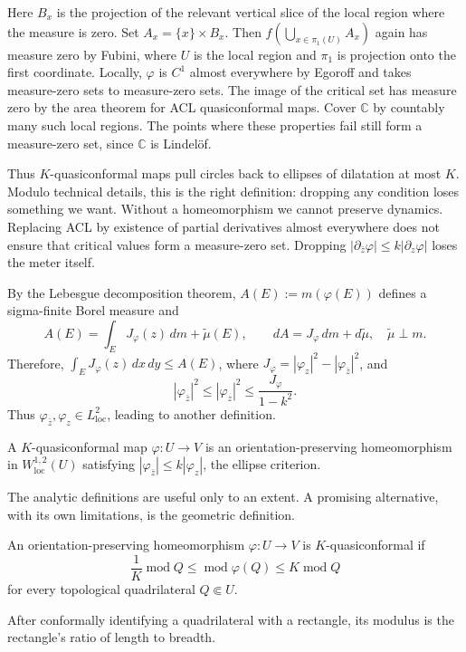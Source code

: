 \documentclass[11pt,a4paper]{article}
\begin{document}
Here \(B_x\) is the projection of the relevant vertical slice of the local region where the measure is zero. Set \(A_x=\{x\}\times B_x\).
Then \(f(\bigcup_{x\in\pi_1(U)}A_x)\) again has measure zero by Fubini, where \(U\) is the local region and \(\pi_1\) is projection onto the first coordinate.
Locally, \(\varphi\) is \(C^1\) almost everywhere by Egoroff and takes measure-zero sets to measure-zero sets. The image of the critical set has measure zero by the area theorem for ACL quasiconformal maps.
Cover \(\mathbb C\) by countably many such local regions. The points where these properties fail still form a measure-zero set, since \(\mathbb C\) is Lindel\"of.

Thus \(K\)-quasiconformal maps pull circles back to ellipses of dilatation at most \(K\). Modulo technical details, this is the right definition: dropping any condition loses something we want. Without a homeomorphism we cannot preserve dynamics. Replacing ACL by existence of partial derivatives almost everywhere does not ensure that critical values form a measure-zero set. Dropping
\(|\partial_{\bar z}\varphi|\le k|\partial_z\varphi|\) loses the meter itself.

By the Lebesgue decomposition theorem, \(A(E):=m(\varphi(E))\) defines a sigma-finite Borel measure and
\[
A(E)=\int_EJ_\varphi(z)\,dm+\widetilde\mu(E),\qquad
dA=J_\varphi\,dm+d\widetilde\mu,\quad\widetilde\mu\perp m.
\]
Therefore, \(\int_EJ_\varphi(z)\,dx\,dy\le A(E)\), where
\(J_\varphi=|\varphi_z|^2-|\varphi_{\bar z}|^2\), and
\[
|\varphi_{\bar z}|^2\le|\varphi_z|^2\le\frac{J_\varphi}{1-k^2}.
\]
Thus \(\varphi_{\bar z},\varphi_z\in L^2_{\mathrm{loc}}\), leading to another definition.
\setcounter{definition}{22}\begin{definition}
A \(K\)-quasiconformal map \(\varphi:U\to V\) is an orientation-preserving homeomorphism in \(W^{1,2}_{\mathrm{loc}}(U)\) satisfying
\(|\varphi_{\bar z}|\le k|\varphi_z|\), the ellipse criterion.
\end{definition}
The analytic definitions are useful only to an extent. A promising alternative, with its own limitations, is the geometric definition.
\setcounter{definition}{23}\begin{definition}
An orientation-preserving homeomorphism \(\varphi:U\to V\) is \(K\)-quasiconformal if
\[
\frac1K\operatorname{mod}Q
\le\operatorname{mod}\varphi(Q)
\le K\operatorname{mod}Q
\]
for every topological quadrilateral \(Q\Subset U\).
\end{definition}
After conformally identifying a quadrilateral with a rectangle, its modulus is the rectangle's ratio of length to breadth.
\end{document}

